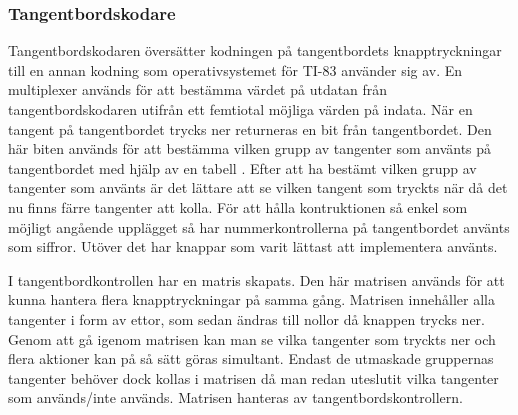 \documentclass[main.tex]{subfiles}
\begin{document}
\subsubsection{Tangentbordskodare}
Tangentbordskodaren översätter kodningen på tangentbordets knapptryckningar
till en annan kodning som operativsystemet för TI-83 använder sig av. En
multiplexer används för att bestämma värdet på utdatan från tangentbordskodaren
utifrån ett femtiotal möjliga värden på indata. När en tangent på tangentbordet
trycks ner returneras en bit från tangentbordet. Den här biten används för att
bestämma vilken grupp av tangenter som använts på tangentbordet med hjälp av en
tabell \cite{kbdenc}. Efter att ha bestämt vilken grupp av tangenter som
använts är det lättare att se vilken tangent som tryckts när då det nu finns
färre tangenter att kolla. För att hålla kontruktionen så enkel som möjligt
angående upplägget så har nummerkontrollerna på tangentbordet använts som
siffror. Utöver det har knappar som varit lättast att implementera använts.

I tangentbordkontrollen har en matris skapats. Den här matrisen används för att
kunna hantera flera knapptryckningar på samma gång. Matrisen innehåller alla
tangenter i form av ettor, som sedan ändras till nollor då knappen trycks ner.
Genom att gå igenom matrisen kan man se vilka tangenter som tryckts ner och
flera aktioner kan på så sätt göras simultant. Endast de utmaskade gruppernas
tangenter behöver dock kollas i matrisen då man redan uteslutit vilka tangenter
som används/inte används. Matrisen hanteras av tangentbordskontrollern.
\end{document}
